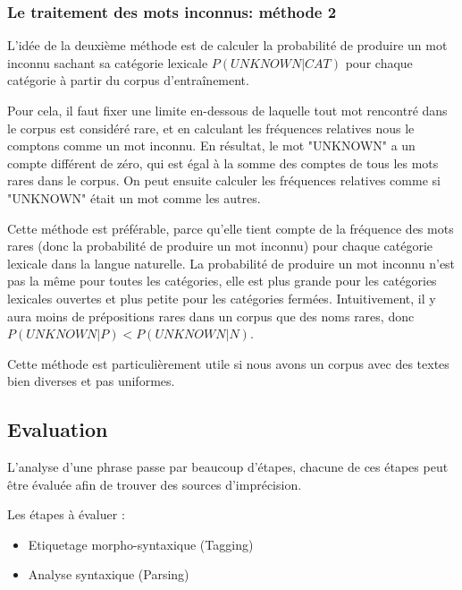 \documentclass[12pt]{article}
\begin{document}
\subsubsection{Le traitement des mots inconnus: m\'ethode 2}

L'id\'ee de la deuxi\`eme m\'ethode est de calculer la probabilit\'e de
produire un mot inconnu sachant sa cat\'egorie lexicale $P(UNKNOWN|CAT)$ pour
chaque cat\'egorie \`a partir du corpus d'entra\^inement.\par

Pour cela, il faut fixer une limite en-dessous de laquelle tout mot rencontr\'e dans le corpus est
consid\'er\'e rare, et en calculant les fr\'equences relatives nous le comptons comme
un mot inconnu. En r\'esultat, le mot "UNKNOWN" a un compte diff\'erent de z\'ero, qui
est \'egal \`a la somme des comptes de tous les mots rares dans le corpus. On peut
ensuite calculer les fr\'equences relatives comme si "UNKNOWN" \'etait un mot comme
les autres.
\par

Cette m\'ethode est pr\'ef\'erable, parce qu'elle tient compte de la
fr\'equence des mots rares (donc la probabilit\'e de produire un mot inconnu) pour
chaque cat\'egorie lexicale dans la langue naturelle. La probabilit\'e
de produire un mot inconnu n'est pas la m\^eme pour toutes les
cat\'egories, elle est plus grande pour les cat\'egories lexicales ouvertes et plus
petite pour les cat\'egories ferm\'ees.
Intuitivement, il y aura moins de pr\'epositions rares dans un corpus que des noms rares, donc $P(UNKNOWN|P) < P(UNKNOWN|N)$.
\par

Cette m\'ethode est particuli\`erement utile si nous avons un corpus avec des
textes bien diverses et pas uniformes.

\subsection{Evaluation}

L'analyse d'une phrase passe par beaucoup d'\'etapes, chacune de ces \'etapes peut
\^etre \'evalu\'ee afin de trouver des sources d'impr\'ecision.\par

Les \'etapes \`a \'evaluer :
\begin{itemize}
\item Etiquetage morpho-syntaxique (Tagging)
\item Analyse syntaxique (Parsing)
\end{itemize}
\end{document}
